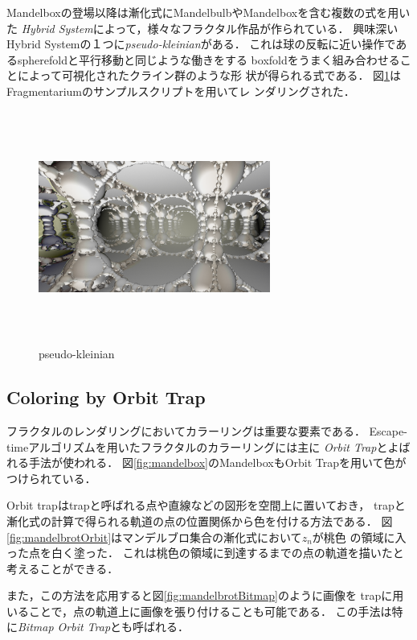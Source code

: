 Mandelboxの登場以降は漸化式にMandelbulbやMandelboxを含む複数の式を用いた
\textit{Hybrid System}によって，様々なフラクタル作品が作られている．
興味深いHybrid Systemの１つに\textit{pseudo-kleinian}がある．
これは球の反転に近い操作であるspherefoldと平行移動と同じような働きをする
boxfoldをうまく組み合わせることによって可視化されたクライン群のような形
状が得られる式である．
図\ref{fig:pseudoKleinian}はFragmentariumのサンプルスクリプトを用いてレ
ンダリングされた．

\begin{figure}[htbp]
  \begin{center}
   \includegraphics[width=3in, height=3in, keepaspectratio]{../img/fractal/pseudoKleinian.pdf}
   \caption{pseudo-kleinian}
   \label{fig:pseudoKleinian}
  \end{center}
\end{figure}


\subsection{Coloring by Orbit Trap}

フラクタルのレンダリングにおいてカラーリングは重要な要素である．
Escape-timeアルゴリズムを用いたフラクタルのカラーリングには主に\textit{
Orbit Trap}とよばれる手法が使われる．
図\ref{fig:mandelbox}のMandelboxもOrbit Trapを用いて色がつけられている．

Orbit trapはtrapと呼ばれる点や直線などの図形を空間上に置いておき，
trapと漸化式の計算で得られる軌道の点の位置関係から色を付ける方法である．
図\ref{fig:mandelbrotOrbit}はマンデルブロ集合の漸化式において$z_n$が桃色
の領域に入った点を白く塗った．
これは桃色の領域に到達するまでの点の軌道を描いたと考えることができる．

また，この方法を応用すると図\ref{fig:mandelbrotBitmap}のように画像を
trapに用いることで，点の軌道上に画像を張り付けることも可能である．
この手法は特に\textit{Bitmap Orbit Trap}とも呼ばれる．

